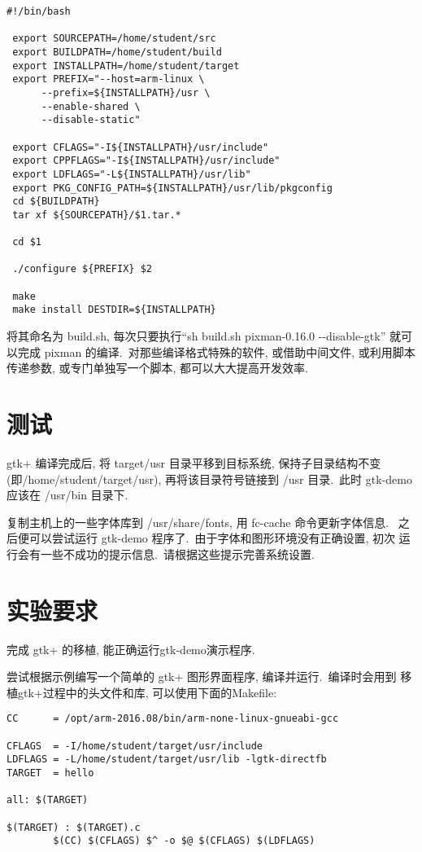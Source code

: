 \begin{lstlisting}[frame=trBL]
 #!/bin/bash

 export SOURCEPATH=/home/student/src
 export BUILDPATH=/home/student/build
 export INSTALLPATH=/home/student/target
 export PREFIX="--host=arm-linux \
 　　　--prefix=${INSTALLPATH}/usr \
 　　　--enable-shared \
 　　　--disable-static"

 export CFLAGS="-I${INSTALLPATH}/usr/include"
 export CPPFLAGS="-I${INSTALLPATH}/usr/include"
 export LDFLAGS="-L${INSTALLPATH}/usr/lib"
 export PKG_CONFIG_PATH=${INSTALLPATH}/usr/lib/pkgconfig
 cd ${BUILDPATH}
 tar xf ${SOURCEPATH}/$1.tar.*

 cd $1

 ./configure ${PREFIX} $2

 make
 make install DESTDIR=${INSTALLPATH}
\end{lstlisting}

将其命名为 build.sh, 每次只要执行``sh build.sh pixman-0.16.0 -{}-disable-gtk''
就可以完成 pixman 的编译.~对那些编译格式特殊的软件, 或借助中间文件, 或利用脚本
传递参数, 或专门单独写一个脚本, 都可以大大提高开发效率.

\section{测试}
    gtk+ 编译完成后, 将 target/usr 目录平移到目标系统, 保持子目录结构不变
(即/home/student/target/usr), 再将该目录符号链接到 /usr 目录.~此时 gtk-demo
应该在 /usr/bin 目录下.

    复制主机上的一些字体库到 /usr/share/fonts, 用 fc-cache 命令更新字体信息.
~之后便可以尝试运行 gtk-demo 程序了.~由于字体和图形环境没有正确设置, 初次
运行会有一些不成功的提示信息.~请根据这些提示完善系统设置.

\section{实验要求}
    完成 gtk+ 的移植, 能正确运行gtk-demo演示程序.

    尝试根据示例编写一个简单的 gtk+ 图形界面程序, 编译并运行.~编译时会用到
移植gtk+过程中的头文件和库, 可以使用下面的Makefile:

\lstset{language=make}
\begin{lstlisting}[frame=trBL]
CC      = /opt/arm-2016.08/bin/arm-none-linux-gnueabi-gcc

CFLAGS  = -I/home/student/target/usr/include
LDFLAGS = -L/home/student/target/usr/lib -lgtk-directfb
TARGET  = hello

all: $(TARGET)

$(TARGET) : $(TARGET).c
        $(CC) $(CFLAGS) $^ -o $@ $(CFLAGS) $(LDFLAGS)

\end{lstlisting}
